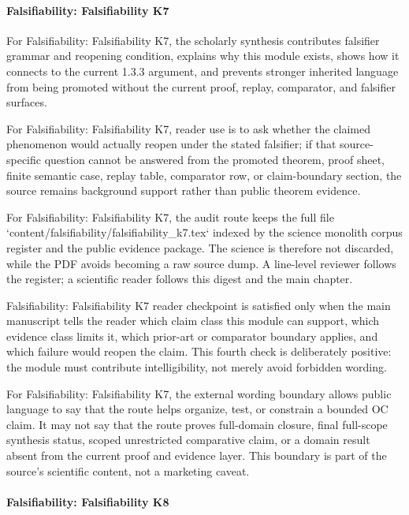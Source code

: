 \paragraph{Falsifiability: Falsifiability K7}

For Falsifiability: Falsifiability K7, the scholarly synthesis contributes falsifier grammar and reopening condition, explains why this module exists, shows how it connects to the current 1.3.3 argument, and prevents stronger inherited language from being promoted without the current proof, replay, comparator, and falsifier surfaces.


For Falsifiability: Falsifiability K7, reader use is to ask whether the claimed phenomenon would actually reopen under the stated falsifier; if that source-specific question cannot be answered from the promoted theorem, proof sheet, finite semantic case, replay table, comparator row, or claim-boundary section, the source remains background support rather than public theorem evidence.


For Falsifiability: Falsifiability K7, the audit route keeps the full file `content/falsifiability/falsifiability\_k7.tex` indexed by the science monolith corpus register and the public evidence package. The science is therefore not discarded, while the PDF avoids becoming a raw source dump. A line-level reviewer follows the register; a scientific reader follows this digest and the main chapter.


Falsifiability: Falsifiability K7 reader checkpoint is satisfied only when the main manuscript tells the reader which claim class this module can support, which evidence class limits it, which prior-art or comparator boundary applies, and which failure would reopen the claim. This fourth check is deliberately positive: the module must contribute intelligibility, not merely avoid forbidden wording.


For Falsifiability: Falsifiability K7, the external wording boundary allows public language to say that the route helps organize, test, or constrain a bounded OC claim. It may not say that the route proves full-domain closure, final full-scope synthesis status, scoped unrestricted comparative claim, or a domain result absent from the current proof and evidence layer. This boundary is part of the source's scientific content, not a marketing caveat.


\paragraph{Falsifiability: Falsifiability K8}

